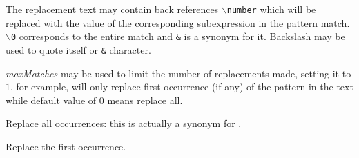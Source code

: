 The replacement text may contain back references {\tt $\backslash$number} which will be
replaced with the value of the corresponding subexpression in the
pattern match. {\tt $\backslash$0} corresponds to the entire match and {\tt \&} is a
synonym for it. Backslash may be used to quote itself or {\tt \&} character.

{\it maxMatches} may be used to limit the number of replacements made, setting
it to $1$, for example, will only replace first occurrence (if any) of the
pattern in the text while default value of $0$ means replace all.

\label{wxregexreplaceall}


Replace all occurrences: this is actually a synonym for 
.



\label{wxregexreplacefirst}


Replace the first occurrence.



